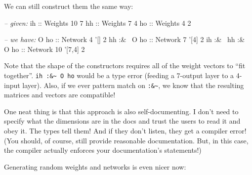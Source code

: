 \documentclass[]{article}
\newenvironment{Shaded}{}{}
\newcommand{\KeywordTok}[1]{\textcolor[rgb]{0.00,0.44,0.13}{\textbf{{#1}}}}
\newcommand{\DataTypeTok}[1]{\textcolor[rgb]{0.56,0.13,0.00}{{#1}}}
\newcommand{\DecValTok}[1]{\textcolor[rgb]{0.25,0.63,0.44}{{#1}}}
\newcommand{\CharTok}[1]{\textcolor[rgb]{0.25,0.44,0.63}{{#1}}}
\newcommand{\CommentTok}[1]{\textcolor[rgb]{0.38,0.63,0.69}{\textit{{#1}}}}
\newcommand{\OtherTok}[1]{\textcolor[rgb]{0.00,0.44,0.13}{{#1}}}
\newcommand{\FunctionTok}[1]{\textcolor[rgb]{0.02,0.16,0.49}{{#1}}}
\newcommand{\NormalTok}[1]{{#1}}
\begin{document}
We can still construct them the same way:

\begin{Shaded}
\begin{Highlighting}[]
\CommentTok{-- given:}
\OtherTok{ih ::} \DataTypeTok{Weights} \DecValTok{10} \DecValTok{7}
\OtherTok{hh ::} \DataTypeTok{Weights}  \DecValTok{7} \DecValTok{4}
\OtherTok{ho ::} \DataTypeTok{Weights}  \DecValTok{4} \DecValTok{2}

\CommentTok{-- we have:}
              \DataTypeTok{O}\OtherTok{ ho ::} \DataTypeTok{Network}  \DecValTok{4} \CharTok{'[] 2}
       \NormalTok{hh }\FunctionTok{:&~} \DataTypeTok{O}\OtherTok{ ho ::} \DataTypeTok{Network}  \DecValTok{7} \CharTok{'[4] 2}
\NormalTok{ih }\FunctionTok{:&~} \NormalTok{hh }\FunctionTok{:&~} \DataTypeTok{O}\OtherTok{ ho ::} \DataTypeTok{Network} \DecValTok{10} \CharTok{'[7,4] 2}
\end{Highlighting}
\end{Shaded}

Note that the shape of the constructors requires all of the weight
vectors to ``fit together''. \texttt{ih\ :\&\textasciitilde{}\ O\ ho}
would be a type error (feeding a 7-output layer to a 4-input layer).
Also, if we ever pattern match on \texttt{:\&\textasciitilde{}}, we know
that the resulting matrices and vectors are compatible!

One neat thing is that this approach is also self-documenting. I don't
need to specify what the dimensions are in the docs and trust the users
to read it and obey it. The types tell them! And if they don't listen,
they get a compiler error! (You should, of course, still provide
reasonable documentation. But, in this case, the compiler actually
enforces your documentation's statements!)

Generating random weights and networks is even nicer now:

\begin{Shaded}
\end{Shaded}
\end{document}
